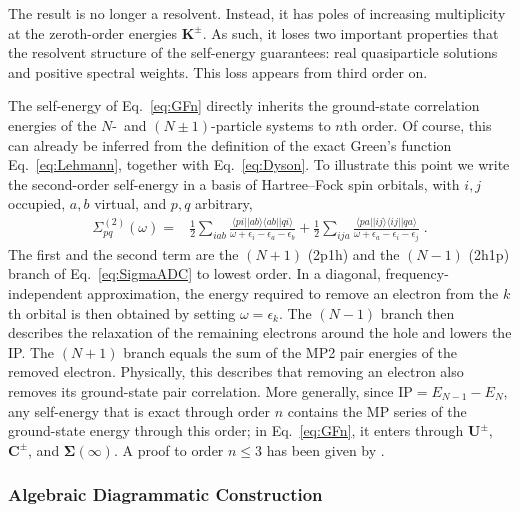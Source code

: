 \documentclass[aip,jcp,reprint,noshowkeys,superscriptaddress]{revtex4-2}
\begin{document}
The result is no longer a resolvent. Instead, it has poles of increasing multiplicity at the zeroth-order energies $\mathbf{K}^{\pm}$. As such, it loses two important properties that the resolvent structure of the self-energy guarantees: real quasiparticle solutions and positive spectral weights. This loss appears from third order on.\cite{Winter_1972,Cederbaum_1973}

The self-energy of Eq.~\eqref{eq:GFn} directly inherits the ground-state correlation energies of the $N$-~and $(N \pm 1)$-particle systems to $n$th order. Of course, this can already be inferred from the definition of the exact Green's function Eq.~\eqref{eq:Lehmann}, together with Eq.~\eqref{eq:Dyson}. To illustrate this point we write the second-order self-energy in a basis of Hartree--Fock spin orbitals, with $i,j$ occupied, $a,b$ virtual, and $p,q$ arbitrary,
\begin{align}
    \Sigma^{(2)}_{pq}(\omega) =& \frac{1}{2}\sum_{iab} \frac{\langle pi||ab\rangle \langle ab||qi\rangle}{\omega + \epsilon_i - \epsilon_a - \epsilon_b} + \frac{1}{2}\sum_{ija} \frac{\langle pa||ij\rangle \langle ij||qa\rangle}{\omega + \epsilon_a - \epsilon_i - \epsilon_j} \;.
    \label{eq:Sigma2}
\end{align}
The first and the second term are the $(N+1)$ (2p1h) and the $(N-1)$ (2h1p) branch of Eq.~\eqref{eq:SigmaADC} to lowest order. In a diagonal, frequency-independent approximation, the energy required to remove an electron from the $k$th orbital is then obtained by setting $\omega = \epsilon_k$. The $(N-1)$ branch then describes the relaxation of the remaining electrons around the hole and lowers the IP. The $(N+1)$ branch equals the sum of the MP2 pair energies of the removed electron. Physically, this describes that removing an electron also removes its ground-state pair correlation.\cite{Pickup_1973,Cederbaum_1977a,SzaboBook} More generally, since $\mathrm{IP} = E_{N-1} - E_N$, any self-energy that is exact through order $n$ contains the MP series of the ground-state energy through this order; in Eq.~\eqref{eq:GFn}, it enters through $\mathbf{U}^{\pm}$, $\mathbf{C}^{\pm}$, and $\pmb{\Sigma}(\infty)$. A proof to order $n \leq 3$ has been given by \citet{Hirata_2017}.

\subsubsection{Algebraic Diagrammatic Construction}
\end{document}

